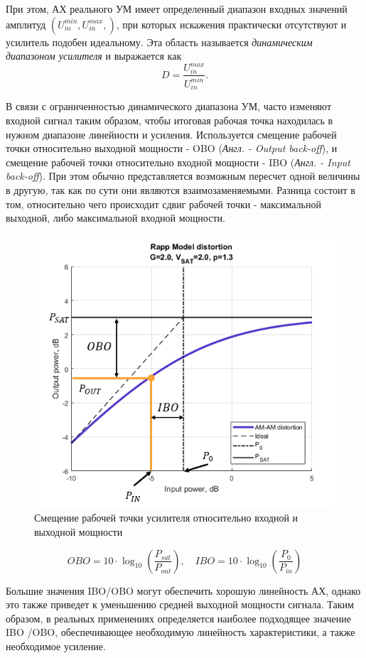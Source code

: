 При этом, АХ реального УМ имеет определенный диапазон входных значений
амплитуд $(U_{in}^{min},U_{in}^{max},)$, при которых искажения практически
отсутствуют и усилитель подобен идеальному. Эта область называется
\textit{динамическим диапазоном усилителя} и выражается как
\begin{equation}
    D = \frac{U_{in}^{max}}{U_{in}^{min}}.
\end{equation}

В связи с ограниченностью динамического диапазона УМ, часто изменяют
входной сигнал таким образом, чтобы итоговая рабочая точка находилась в
нужном диапазоне линейности и усиления. Используется смещение рабочей точки
относительно выходной мощности - OBO (\textit{Англ. - Output back-off}), и
смещение рабочей точки относительно входной мощности - IBO (\textit{Англ. -
Input back-off}). При этом обычно представляется возможным пересчет одной
величины в другую, так как по сути они являются взаимозаменяемыми. Разница
состоит в том, относительно чего происходит сдвиг рабочей точки -
максимальной выходной, либо максимальной входной мощности.

\begin{figure}[h!]
    \centering
    \includegraphics[width=0.7\linewidth]{figs/pa_obo_ibo.png}
    \caption{Смещение рабочей точки усилителя относительно входной и выходной мощности}
    \label{fig:1.2}
\end{figure}

\begin{equation}
    OBO = 10 \cdot \log_{10}\left(\frac{P_{sat}}{P_{out}}\right), \quad
    IBO = 10 \cdot \log_{10}\left(\frac{P_{0}}{P_{in}}\right)
\end{equation}

Большие значения IBO\slash OBO могут обеспечить хорошую линейность АХ,
однако это также приведет к уменьшению средней выходной мощности сигнала.
Таким образом, в реальных применениях определяется наиболее подходящее
значение IBO \slash OBO, обеспечивающее необходимую линейность
характеристики, а также необходимое усиление.


